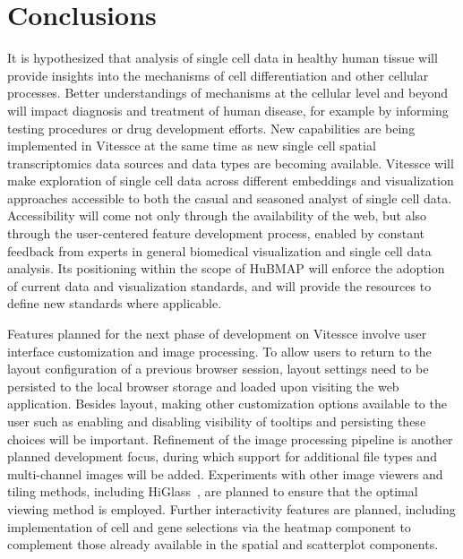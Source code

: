 \documentclass[12pt, letterpaper]{article}
\begin{document}
\section{Conclusions}
It is hypothesized that analysis of single cell data in healthy human tissue will provide insights into the mechanisms of cell differentiation and other cellular processes.
Better understandings of mechanisms at the cellular level and beyond will impact diagnosis and treatment of human disease, for example by informing testing procedures or drug development efforts.
New capabilities are being implemented in Vitessce at the same time as new single cell spatial transcriptomics data sources and data types are becoming available.
Vitessce will make exploration of single cell data across different embeddings and visualization approaches accessible to both the casual and seasoned analyst of single cell data.
Accessibility will come not only through the availability of the web, but also through the user-centered feature development process, enabled by constant feedback from experts in general biomedical visualization and single cell data analysis.
Its positioning within the scope of HuBMAP will enforce the adoption of current data and visualization standards, and will provide the resources to define new standards where applicable.

Features planned for the next phase of development on Vitessce involve user interface customization and image processing.
To allow users to return to the layout configuration of a previous browser session, layout settings need to be persisted to the local browser storage and loaded upon visiting the web application.
Besides layout, making other customization options available to the user such as enabling and disabling visibility of tooltips and persisting these choices will be important.
Refinement of the image processing pipeline is another planned development focus, during which support for additional file types and multi-channel images will be added.
Experiments with other image viewers and tiling methods, including HiGlass~\cite{kerpedjiev2018higlass}, are planned to ensure that the optimal viewing method is employed.
Further interactivity features are planned, including implementation of cell and gene selections via the heatmap component to complement those already available in the spatial and scatterplot components.
\end{document}
